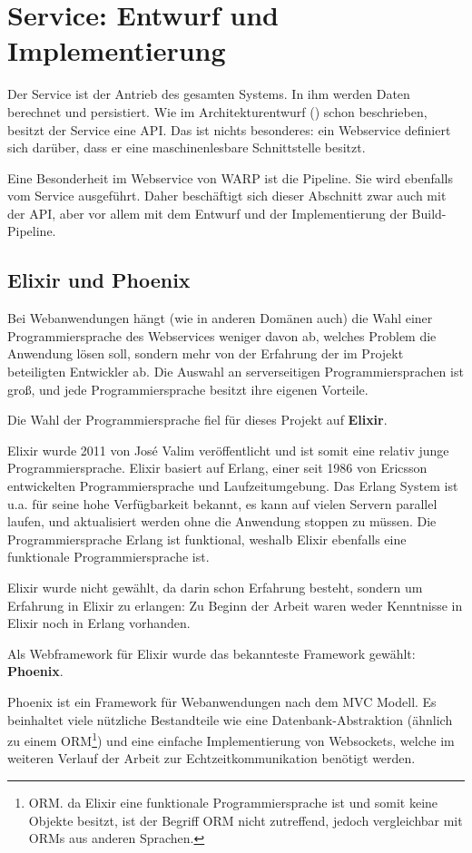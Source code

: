 \section{Service: Entwurf und Implementierung}
\label{sec:service}

Der Service ist der Antrieb des gesamten Systems. In ihm werden Daten berechnet und persistiert. Wie im Architekturentwurf () schon beschrieben, besitzt der Service eine \ac{API}. Das ist nichts besonderes: ein Webservice definiert sich darüber, dass er eine maschinenlesbare Schnittstelle besitzt.

Eine Besonderheit im Webservice von WARP ist die Pipeline. Sie wird ebenfalls vom Service ausgeführt. Daher beschäftigt sich dieser Abschnitt zwar auch mit der \ac{API}, aber vor allem mit dem Entwurf und der Implementierung der Build-Pipeline.

\subsection{Elixir und Phoenix}

Bei Webanwendungen hängt (wie in anderen Domänen auch) die Wahl einer Programmiersprache des Webservices weniger davon ab, welches Problem die Anwendung lösen soll, sondern mehr von der Erfahrung der im Projekt beteiligten Entwickler ab. Die Auswahl an serverseitigen Programmiersprachen ist groß, und jede Programmiersprache besitzt ihre eigenen Vorteile.

Die Wahl der Programmiersprache fiel für dieses Projekt auf \textbf{Elixir}.

Elixir wurde 2011 von José Valim veröffentlicht und ist somit eine relativ junge Programmiersprache. Elixir basiert auf Erlang, einer seit 1986 von Ericsson entwickelten Programmiersprache und Laufzeitumgebung. Das Erlang System ist u.a. für seine hohe Verfügbarkeit bekannt, es kann auf vielen Servern parallel laufen, und aktualisiert werden ohne die Anwendung stoppen zu müssen. Die Programmiersprache Erlang ist funktional, weshalb Elixir ebenfalls eine funktionale Programmiersprache ist.

Elixir wurde nicht gewählt, da darin schon Erfahrung besteht, sondern um Erfahrung in Elixir zu erlangen: Zu Beginn der Arbeit waren weder Kenntnisse in Elixir noch in Erlang vorhanden.

Als Webframework für Elixir wurde das bekannteste Framework gewählt: \textbf{Phoenix}.

Phoenix ist ein Framework für Webanwendungen nach dem \ac{MVC} Modell. Es beinhaltet viele nützliche Bestandteile wie eine Datenbank-Abstraktion (ähnlich zu einem \acs{ORM}\footnote{\acf{ORM}. da Elixir eine funktionale Programmiersprache ist und somit keine Objekte besitzt, ist der Begriff \acs{ORM} nicht zutreffend, jedoch vergleichbar mit ORMs aus anderen Sprachen.}) und eine einfache Implementierung von Websockets, welche im weiteren Verlauf der Arbeit zur Echtzeitkommunikation benötigt werden.

